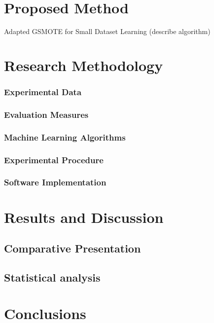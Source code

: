 \documentclass[parskip=full]{scrartcl}
\begin{document}
\section{Proposed Method}

Adapted GSMOTE for Small Dataset Learning (describe algorithm)

\section{Research Methodology}

\subsubsection{Experimental Data}
\subsubsection{Evaluation Measures}
\subsubsection{Machine Learning Algorithms}
\subsubsection{Experimental Procedure}
\subsubsection{Software Implementation}

\section{Results and Discussion}
\subsection{Comparative Presentation}
\subsection{Statistical analysis}

\section{Conclusions}



\end{document}
